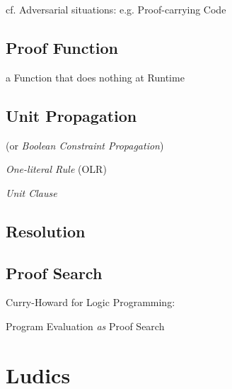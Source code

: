cf. Adversarial situations: e.g. Proof-carrying Code %



\subsection{Proof Function}\label{sec:proof_function}


a Function that does nothing at Runtime



\subsection{Unit Propagation}\label{sec:unit_propagation}

(or \emph{Boolean Constraint Propagation})

\emph{One-literal Rule} (OLR)

\emph{Unit Clause}



\subsection{Resolution}\label{sec:resolution}

\subsection{Proof Search}\label{sec:proof_search}

Curry-Howard for Logic Programming: \cite{wadler12}

Program Evaluation \emph{as} Proof Search



\section{Ludics} \label{sec:ludics}

